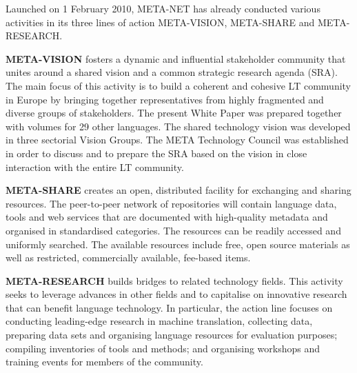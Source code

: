 Launched on 1 February 2010, META-NET has already conducted various activities in its three lines of action META-VISION, META-SHARE and META-RESEARCH.  


{\bf META-VISION} fosters a dynamic and influential stakeholder community that
unites around a shared vision and a common strategic research agenda
(SRA). The main focus of this activity is to build a coherent and
cohesive LT community in Europe by bringing together representatives
from highly fragmented and diverse groups of stakeholders. The present White Paper was prepared together with volumes for 29 other languages. The shared technology vision was developed in three sectorial Vision Groups. The META Technology Council was established in order to discuss and to prepare the SRA based on the vision in close interaction with the entire LT community.

{\bf META-SHARE} creates an open, distributed facility for exchanging and
sharing resources. The peer-to-peer network of repositories will contain
language data, tools and web services that are documented with
high-quality metadata and organised in standardised categories. The
resources can be readily accessed and uniformly searched. The available
resources include free, open source materials as well as restricted,
commercially available, fee-based items. 

{\bf META-RESEARCH} builds bridges to related technology fields. This activity
seeks to leverage advances in other fields and to capitalise on
innovative research that can benefit language technology. In particular, the action line focuses on conducting leading-edge research in machine translation, collecting data, preparing data sets and organising language resources for evaluation purposes; compiling inventories of tools and methods; and organising workshops and training events for members of the community. 
